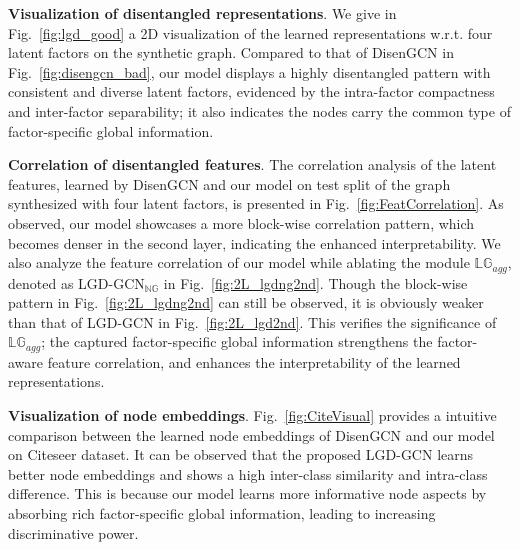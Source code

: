 \documentclass[accepted]{uai2021} %
\begin{document}
\textbf{Visualization of disentangled representations}. We give in Fig.~\ref{fig:lgd_good} a 2D visualization of the learned representations w.r.t. four latent factors on the synthetic graph. Compared to that of DisenGCN in Fig.~\ref{fig:disengcn_bad}, our model displays a highly disentangled pattern with consistent and diverse latent factors, evidenced by the intra-factor compactness and inter-factor separability; it also indicates the nodes carry the common type of factor-specific global information.

\textbf{Correlation of disentangled features}. The correlation analysis of the latent features, learned by DisenGCN and our model on test split of the graph synthesized with four latent factors, is presented in Fig.~\ref{fig:FeatCorrelation}. As observed, our model showcases a more block-wise correlation pattern, which becomes denser in the second layer, indicating the enhanced interpretability. We also analyze the feature correlation of our model while ablating the module $\mathbb{LG}_{agg}$, denoted as LGD-GCN$_{\mathbb{NG}}$ in Fig.~\ref{fig:2L_lgdng2nd}. Though the block-wise pattern in Fig.~\ref{fig:2L_lgdng2nd}  can still be observed, it is obviously weaker than that of LGD-GCN in Fig.~\ref{fig:2L_lgd2nd}. This verifies the significance of $\mathbb{LG}_{agg}$; the captured factor-specific global information strengthens the factor-aware feature correlation, and enhances the interpretability  of the learned representations.

\textbf{Visualization of node embeddings}. Fig.~\ref{fig:CiteVisual} provides a intuitive comparison between the learned node embeddings of DisenGCN and our model on Citeseer dataset. It can be observed that the proposed LGD-GCN learns better node embeddings and shows a high inter-class similarity and intra-class difference. This is because our model learns more informative node aspects by absorbing rich factor-specific global information, leading to increasing discriminative power.
\end{document}
